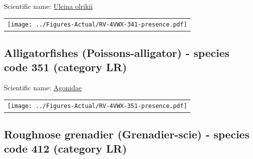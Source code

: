 \documentclass[12pt]{article}\usepackage[]{graphicx}\usepackage[]{color}
\begin{document}
  


Scientific name: \href{http://www.marinespecies.org/aphia.php?p=taxdetails\&id=274356}{Ulcina olrikii} \newline
\begin{minipage}{1.0\textwidth}
 \begin{tabular}{c}
\texttt{[image: ../Figures-Actual/RV-4VWX-341-presence.pdf]} \\ 
\end{tabular} 
\end{minipage}
\clearpage

\renewcommand\thefigure{\thesubsection\Alph{figure}}

\setcounter{figure}{0}

\hypertarget{sec:351}{%
\subsection{Alligatorfishes (Poissons-alligator) - species code 351 (category LR)}\label{sec:351}}

  


Scientific name: \href{http://www.marinespecies.org/aphia.php?p=taxdetails\&id=125588}{Agonidae} \newline
\begin{minipage}{1.0\textwidth}
 \begin{tabular}{c}
\texttt{[image: ../Figures-Actual/RV-4VWX-351-presence.pdf]} \\ 
\end{tabular} 
\end{minipage}
\clearpage

\renewcommand\thefigure{\thesubsection\Alph{figure}}

\setcounter{figure}{0}

\hypertarget{sec:412}{%
\subsection{Roughnose grenadier (Grenadier-scie) - species code 412 (category LR)}\label{sec:412}}

  
\end{document}
